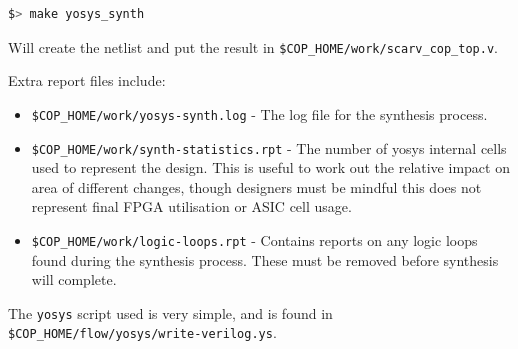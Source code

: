 \begin{lstlisting}[language=bash]
$> make yosys_synth
\end{lstlisting}

Will create the netlist and put the result in 
{\tt \$COP\_HOME/work/scarv_cop_top.v}.

Extra report files include:
\begin{itemize}
\item {\tt \$COP\_HOME/work/yosys-synth.log} - 
    The log file for the synthesis process.
\item {\tt \$COP\_HOME/work/synth-statistics.rpt} - 
    The number of yosys internal cells used to represent the design.
    This is useful to work out the relative impact on area of different
    changes, though designers must be mindful this does not represent
    final FPGA utilisation or ASIC cell usage.
\item {\tt \$COP\_HOME/work/logic-loops.rpt} - 
    Contains reports on any logic loops found during the synthesis process.
    These must be removed before synthesis will complete.
\end{itemize}

The {\tt yosys} script used is very simple, and is found in
{\tt \$COP\_HOME/flow/yosys/write-verilog.ys}.

